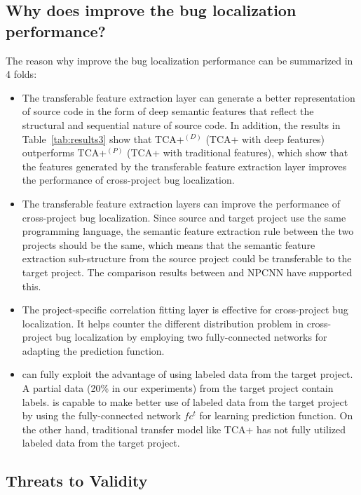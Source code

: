 \subsection{Why does \TRANPCNN improve the bug localization performance?}
The reason why \TRANPCNN improve the bug localization performance can be summarized in 4 folds:
\begin{itemize}
\item The transferable feature extraction layer can generate a better representation of source code in the form of deep semantic features that reflect the structural and sequential nature of source code. In addition, the results in Table~\ref{tab:results3} show that TCA+$^{(D)}$ (TCA+ with deep features) outperforms TCA+$^{(P)}$ (TCA+ with traditional features), which show that the features generated by the transferable feature extraction layer improves the performance of cross-project bug localization. 
\item The transferable feature extraction layers can improve the performance of cross-project bug localization. Since source and target project use the same programming language, the semantic feature extraction rule between the two projects should be the same, which means that the semantic feature extraction sub-structure from the source project could be transferable to the target project. The comparison results between \TRANPCNN and NPCNN have supported this. 
\item The project-specific correlation fitting layer is effective for cross-project bug localization. It helps counter the different distribution problem in cross-project bug localization by employing two fully-connected networks for adapting the prediction function.
\item \TRANPCNN can fully exploit the advantage of using labeled data from the target project. A partial data (20\% in our experiments) from the target project contain labels. \TRANPCNN is capable to make better use of labeled data from the target project by using the fully-connected network $fc^t$ for learning prediction function. On the other hand, traditional transfer model like TCA+ has not fully utilized labeled data from the target project. 
\end{itemize}



\subsection{Threats to Validity}

